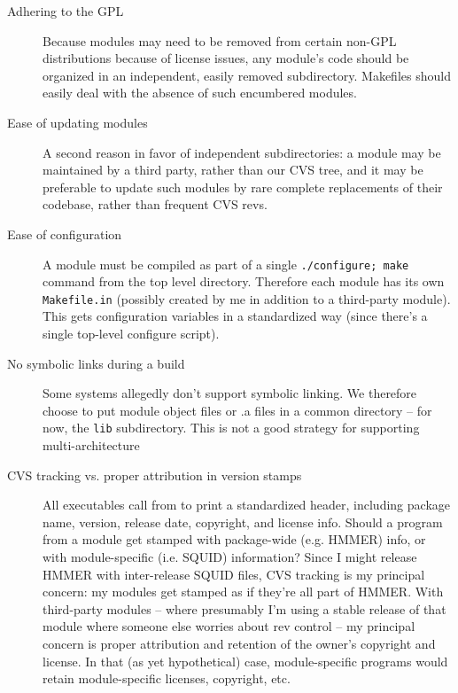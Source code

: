 \begin{description}
\item[Adhering to the GPL] Because modules may need to be removed from
certain non-GPL distributions because of license issues, any module's
code should be organized in an independent, easily removed
subdirectory. Makefiles should easily deal with the absence of
such encumbered modules.

\item[Ease of updating modules] A second reason in favor of
independent subdirectories: a module may be maintained by a third
party, rather than our CVS tree, and it may be preferable to update
such modules by rare complete replacements of their codebase, rather
than frequent CVS revs.

\item[Ease of configuration] A module must be compiled as part of a
single \texttt{./configure; make} command from the top level
directory.  Therefore each module has its own \texttt{Makefile.in}
(possibly created by me in addition to a third-party module).  This
 gets configuration variables in a standardized way
(since there's a single top-level configure script).

\item[No symbolic links during a build] Some systems allegedly don't
support symbolic linking. We therefore choose to put module object
files or .a files in a common directory -- for now, the \texttt{lib}
subdirectory. This is not a good strategy for supporting
multi-architecture 

\item[CVS tracking vs. proper attribution in version stamps] All
executables call  from  to print a
standardized header, including package name, version, release date,
copyright, and license info. Should a program from a module get
stamped with package-wide (e.g. HMMER) info, or with module-specific
(i.e. SQUID) information? Since I might release HMMER with
inter-release SQUID files, CVS tracking is my principal concern: my
modules get stamped as if they're all part of HMMER. With third-party
modules -- where presumably I'm using a stable release of that module
where someone else worries about rev control -- my principal concern
is proper attribution and retention of the owner's copyright and
license. In that (as yet hypothetical) case, module-specific programs
would retain module-specific licenses, copyright, etc.

\end{description}


